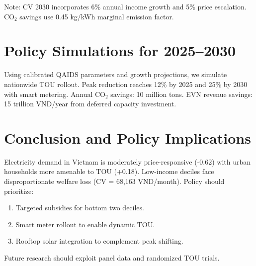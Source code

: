 \documentclass[12pt,a4paper]{article}
\begin{document}
	Note: CV 2030 incorporates 6\% annual income growth and 5\% price escalation. CO$_2$ savings use 0.45 kg/kWh marginal emission factor.
	
	\section{Policy Simulations for 2025--2030}
	Using calibrated QAIDS parameters and growth projections, we simulate nationwide TOU rollout. Peak reduction reaches 12\% by 2025 and 25\% by 2030 with smart metering. Annual CO$_2$ savings: 10 million tons. EVN revenue savings: 15 trillion VND/year from deferred capacity investment.
	
	\section{Conclusion and Policy Implications}
	Electricity demand in Vietnam is moderately price-responsive (-0.62) with urban households more amenable to TOU (+0.18). Low-income deciles face disproportionate welfare loss (CV = 68,163 VND/month). Policy should prioritize:
	\begin{enumerate}
		\item Targeted subsidies for bottom two deciles.
		\item Smart meter rollout to enable dynamic TOU.
		\item Rooftop solar integration to complement peak shifting.
	\end{enumerate}
	
	Future research should exploit panel data and randomized TOU trials.
	
	\clearpage
\end{document}
